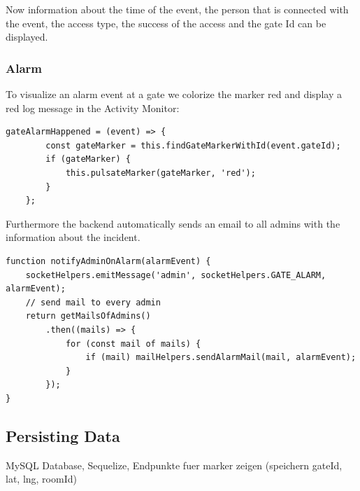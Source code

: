 Now information about the time of the event, the person that is connected with the event, the access type, the success of the access and the gate Id can be displayed.

\subsubsection{Alarm}

To visualize an alarm event at a gate we colorize the marker red and display a red log message in the Activity Monitor:

\begin{lstlisting}[label=alarmEventHappened]
gateAlarmHappened = (event) => {
        const gateMarker = this.findGateMarkerWithId(event.gateId);
        if (gateMarker) {
            this.pulsateMarker(gateMarker, 'red');
        }
    };
\end{lstlisting}

Furthermore the backend automatically sends an email to all admins with the information about the incident.

\begin{lstlisting}[label=notifyOnAlarm]
function notifyAdminOnAlarm(alarmEvent) {
    socketHelpers.emitMessage('admin', socketHelpers.GATE_ALARM, alarmEvent);
    // send mail to every admin
    return getMailsOfAdmins()
        .then((mails) => {
            for (const mail of mails) {
                if (mail) mailHelpers.sendAlarmMail(mail, alarmEvent);
            }
        });
}
\end{lstlisting}

\subsection{Persisting Data}
\label{Persisting Data}

MySQL Database, Sequelize, Endpunkte fuer marker zeigen (speichern gateId, lat, lng, roomId)

\clearpage
